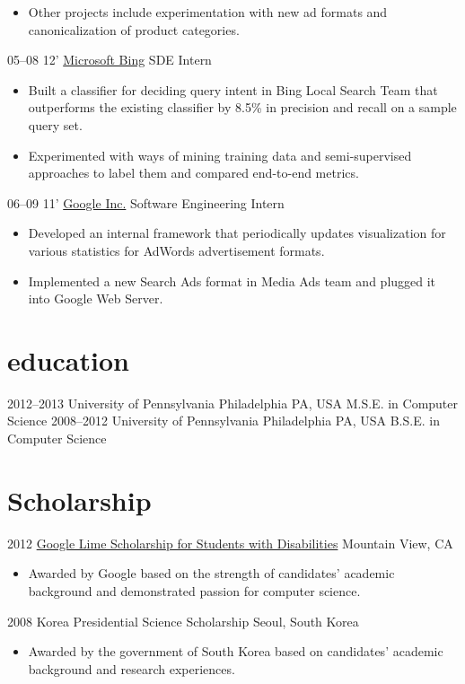 \documentclass[]{patyoon-cv}
\begin{document}
\begin{entrylist}
{\begin{itemize}
    \item Other projects include experimentation with new ad formats and canonicalization of product categories.
    \end{itemize}
  }
  \entry
  {05–08 12'}
  {\href{http://bing.com/}{Microsoft Bing}}
  {SDE Intern}
  {\begin{itemize}
    \item Built a classifier for deciding query intent in Bing Local Search Team that outperforms the existing classifier by 8.5\% in precision and recall on a sample query set.
    \item Experimented with ways of mining training data and semi-supervised approaches to label them and compared end-to-end metrics.
    \end{itemize}}
  \entry
  {06–09 11'}
  {\href{http://www.google.com}{Google Inc.}}
  {Software Engineering Intern}
  {\begin{itemize}
    \item Developed an internal framework that periodically updates visualization for various statistics for AdWords advertisement formats.
    \item Implemented a new Search Ads format in Media Ads team and plugged it into Google Web Server.
    \end{itemize}}
\end{entrylist}

\section{education}

\begin{entrylist}
  \entry
  {2012–2013}
  {University of Pennsylvania}
  {Philadelphia PA, USA}
  {M.S.E. in Computer Science}
  \entry
  {2008–2012}
  {University of Pennsylvania}
  {Philadelphia PA, USA}
  {B.S.E. in Computer Science}
\end{entrylist}

\section{Scholarship}

\begin{entrylist}
  \entry
  {2012} {\href{http://www.limeconnect.com/opportunities/page/google-lime-scholarship-program}
    {Google Lime Scholarship for Students with Disabilities}}
  {Mountain View, CA}
  {\begin{itemize}
    \item Awarded by Google based on the strength of candidates' academic background and demonstrated passion for computer science.
    \end{itemize}
  }
  \entry
  {2008}
  {Korea Presidential Science Scholarship}
  {Seoul, South Korea}
  {\begin{itemize}
    \item Awarded by the government of South Korea based on candidates' academic background and research experiences.
    \end{itemize}
  }
\end{entrylist}
\end{document}
